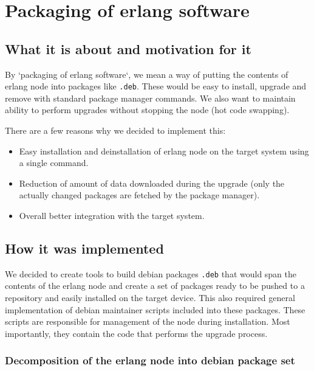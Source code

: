 \section{Packaging of erlang software}

\subsection{What it is about and motivation for it}

By `packaging of erlang software`, we mean a way of putting the contents of erlang node
into packages like {\tt .deb}. These would be easy to install, upgrade and remove with standard
package manager commands. We also want to maintain ability to perform upgrades without
stopping the node (hot code swapping).

There are a few reasons why we decided to implement this:

\begin{itemize}
\item Easy installation and deinstallation of erlang node on the target system using a single command.
\item Reduction of amount of data downloaded during the upgrade (only the actually changed packages
are fetched by the package manager).
\item Overall better integration with the target system.
\end{itemize}

\subsection{How it was implemented}

We decided to create tools to build debian packages {\tt .deb} that would span the contents
of the erlang node and create a set of packages ready to be pushed to a repository and easily installed
on the target device. This also required general implementation of debian maintainer scripts
included into these packages. These scripts are responsible for management of the node
during installation. Most importantly, they contain the code that performs the upgrade process.

\subsubsection{Decomposition of the erlang node into debian package set}

